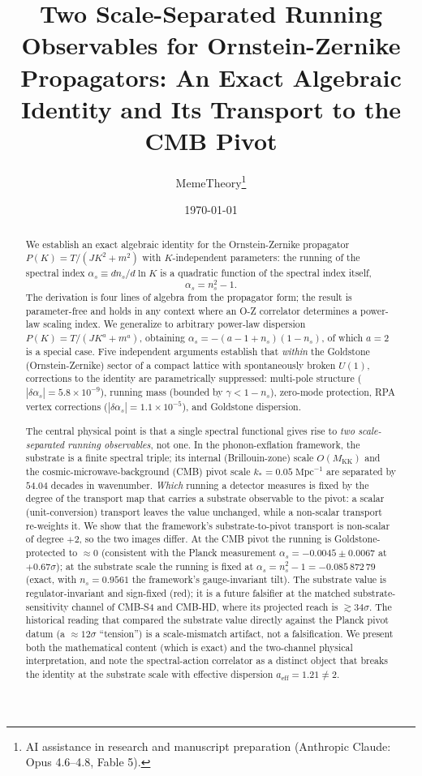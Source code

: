 \documentclass[12pt]{article}
\title{Two Scale-Separated Running Observables for Ornstein-Zernike Propagators: An Exact Algebraic Identity and Its Transport to the CMB Pivot}
\author{MemeTheory\footnote{AI assistance in research and manuscript preparation (Anthropic Claude: Opus 4.6--4.8, Fable 5).}}
\date{\today}
\theoremstyle{definition}
\theoremstyle{remark}
\begin{document}
\maketitle

\begin{abstract}
We establish an exact algebraic identity for the Ornstein-Zernike propagator $P(K) = T/(J K^2 + m^2)$ with $K$-independent parameters: the running of the spectral index $\alpha_s \equiv dn_s/d\ln K$ is a quadratic function of the spectral index itself,
\begin{equation*}
  \alpha_s = n_s^2 - 1.
\end{equation*}
The derivation is four lines of algebra from the propagator form; the result is parameter-free and holds in any context where an O-Z correlator determines a power-law scaling index. We generalize to arbitrary power-law dispersion $P(K) = T/(J K^a + m^a)$, obtaining $\alpha_s = -(a - 1 + n_s)(1 - n_s)$, of which $a = 2$ is a special case. Five independent arguments establish that \emph{within} the Goldstone (Ornstein-Zernike) sector of a compact lattice with spontaneously broken $U(1)$, corrections to the identity are parametrically suppressed: multi-pole structure ($|\delta\alpha_s| = 5.8 \times 10^{-9}$), running mass (bounded by $\gamma < 1 - n_s$), zero-mode protection, RPA vertex corrections ($|\delta\alpha_s| = 1.1 \times 10^{-5}$), and Goldstone dispersion.

The central physical point is that a single spectral functional gives rise to \emph{two scale-separated running observables}, not one. In the phonon-exflation framework, the substrate is a finite spectral triple; its internal (Brillouin-zone) scale $O(M_{\mathrm{KK}})$ and the cosmic-microwave-background (CMB) pivot scale $k_* = 0.05\;\mathrm{Mpc}^{-1}$ are separated by $54.04$ decades in wavenumber. \emph{Which} running a detector measures is fixed by the degree of the transport map that carries a substrate observable to the pivot: a scalar (unit-conversion) transport leaves the value unchanged, while a non-scalar transport re-weights it. We show that the framework's substrate-to-pivot transport is non-scalar of degree $+2$, so the two images differ. At the CMB pivot the running is Goldstone-protected to $\approx 0$ (consistent with the Planck measurement $\alpha_s = -0.0045 \pm 0.0067$ at $+0.67\sigma$); at the substrate scale the running is fixed at $\alpha_s = n_s^2 - 1 = -0.085\,872\,79$ (exact, with $n_s = 0.9561$ the framework's gauge-invariant tilt). The substrate value is regulator-invariant and sign-fixed (red); it is a future falsifier at the matched substrate-sensitivity channel of CMB-S4 and CMB-HD, where its projected reach is $\gtrsim 34\sigma$. The historical reading that compared the substrate value directly against the Planck pivot datum (a $\approx 12\sigma$ ``tension'') is a scale-mismatch artifact, not a falsification. We present both the mathematical content (which is exact) and the two-channel physical interpretation, and note the spectral-action correlator as a distinct object that breaks the identity at the substrate scale with effective dispersion $a_{\mathrm{eff}} = 1.21 \neq 2$.
\end{abstract}
\end{document}
